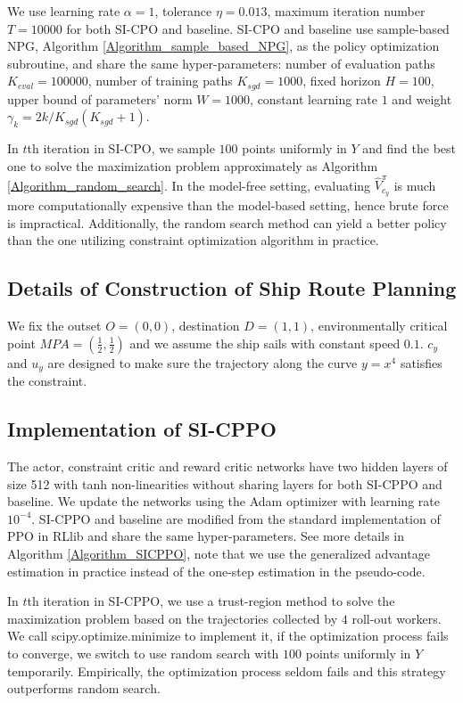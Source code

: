 We use learning rate $\alpha=1$, tolerance $\eta=0.013$, maximum iteration
number $T=10000$ for both SI-CPO and baseline. SI-CPO and baseline use sample-based NPG, Algorithm \ref{Algorithm_sample_based_NPG}, as the policy optimization subroutine, and share the same hyper-parameters: number of evaluation paths $K_{eval}=100000$, number of training paths $K_{sgd}=1000$, fixed horizon $H=100$, upper bound of parameters' norm $W=1000$, constant learning rate $1$ and weight $\gamma_k=2k/K_{sgd}(K_{sgd}+1)$.

In $t$th iteration in SI-CPO, we sample $100$ points uniformly in $Y$ and find the best one to solve the maximization problem approximately as Algorithm \ref{Algorithm_random_search}. In the model-free setting, evaluating $\widehat V^\pi_{c_y}$ is much more computationally expensive than the model-based setting, hence brute force is impractical. Additionally, the random search method can yield a better policy than the one utilizing constraint optimization algorithm in practice. 

\subsection{Details of Construction of Ship Route Planning}
We fix the outset $O=(0, 0)$, destination $D=(1, 1)$, environmentally critical point $MPA=(\frac{1}{2}, \frac{1}{2})$ and we assume the ship sails with constant speed $0.1$. $c_y$ and $u_y$ are designed to make sure the trajectory along the curve $y=x^4$ satisfies the constraint.

\subsection{Implementation of SI-CPPO}
The actor, constraint critic and reward critic networks have two hidden layers of size 512 with tanh non-linearities without sharing layers for both SI-CPPO and baseline. We update the networks using the Adam optimizer with learning rate $10^{-4}$. SI-CPPO and baseline are modified from the standard implementation of PPO in RLlib and share the same hyper-parameters. See more details in Algorithm \ref{Algorithm_SICPPO}, note that we use the generalized advantage estimation in practice instead of the one-step estimation in the pseudo-code.

In $t$th iteration in SI-CPPO, we use a trust-region method to solve the maximization problem based on the trajectories collected by $4$ roll-out workers. We call scipy.optimize.minimize to implement it, if the optimization process fails to converge, we switch to use random search with $100$ points uniformly in $Y$ temporarily. Empirically, the optimization process seldom fails and this strategy outperforms random search.

